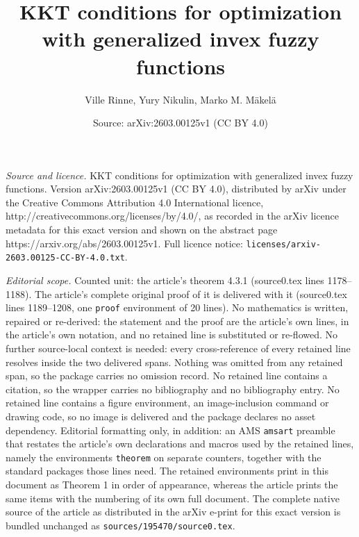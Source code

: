 \documentclass[10pt,a4paper]{amsart}
\title{KKT conditions for optimization with generalized invex fuzzy functions}
\author{Ville Rinne, Yury Nikulin, Marko M. M\"akel\"a}
\date{Source: arXiv:2603.00125v1 (CC BY 4.0)}
\begin{document}
\maketitle

\noindent\emph{Source and licence.} KKT conditions for optimization with generalized invex fuzzy functions. Version arXiv:2603.00125v1 (CC BY 4.0), distributed by arXiv under the Creative Commons Attribution 4.0 International licence, http://creativecommons.org/licenses/by/4.0/, as recorded in the arXiv licence metadata for this exact version and shown on the abstract page https://arxiv.org/abs/2603.00125v1. Full licence notice: \texttt{licenses/arxiv-2603.00125-CC-BY-4.0.txt}.\par\smallskip

\noindent\textit{Editorial scope.} Counted unit: the article's theorem 4.3.1 (source0.tex lines 1178--1188). The article's complete original proof of it is delivered with it (source0.tex lines 1189--1208, one \texttt{proof} environment of 20 lines). No mathematics is written, repaired or re-derived: the statement and the proof are the article's own lines, in the article's own notation, and no retained line is substituted or re-flowed.  No further source-local context is needed: every cross-reference of every retained line resolves inside the two delivered spans.  Nothing was omitted from any retained span, so the package carries no omission record.  No retained line contains a citation, so the wrapper carries no bibliography and no bibliography entry.  No retained line contains a figure environment, an image-inclusion command or drawing code, so no image is delivered and the package declares no asset dependency.  Editorial formatting only, in addition: an AMS \texttt{amsart} preamble that restates the article's own declarations and macros used by the retained lines, namely the environments \texttt{theorem} on separate counters, together with the standard packages those lines need.  The retained environments print in this document as Theorem 1 in order of appearance, whereas the article prints the same items with the numbering of its own full document.  The complete native source of the article as distributed in the arXiv e-print for this exact version is bundled unchanged as \texttt{sources/195470/source0.tex}.
\end{document}
